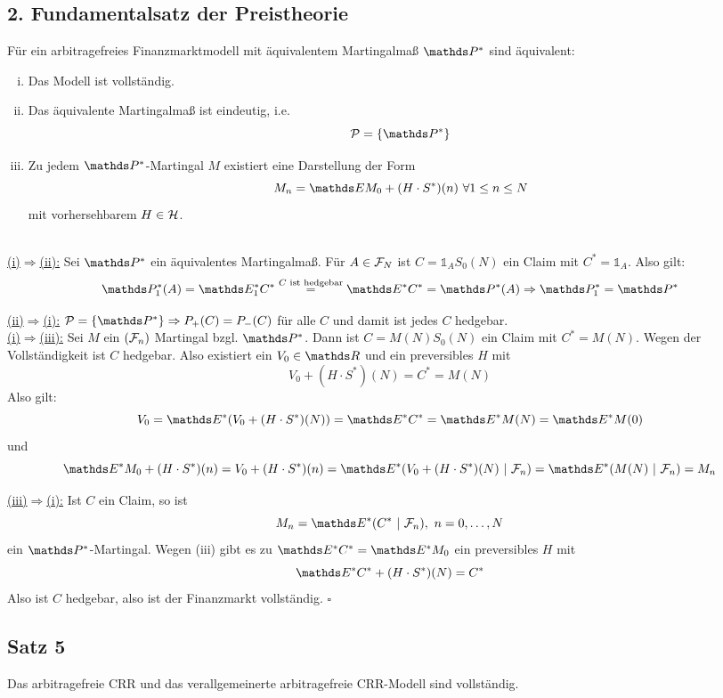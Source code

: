 \subsection{2. Fundamentalsatz der Preistheorie}
\label{sub:2_fundamentalsatz_preistheorie}
Für ein arbitragefreies Finanzmarktmodell mit äquivalentem Martingalmaß $\Pw^*$ sind äquivalent:
\begin{enumerate}[(i)]
	\item Das Modell ist vollständig.
	\item Das äquivalente Martingalmaß ist eindeutig, i.e.
	\[
	\mc{P}=\penbrace{\Pw^*}
	\]
	\item Zu jedem $\Pw^*$-Martingal $M$ existiert eine Darstellung der Form
	\[
	M_n=\E M_0 + (H\cdot S^*)(n) ~\forall 1\le n\le N
	\]
	mit vorhersehbarem $H\in\mathcal{H}$.
\end{enumerate}

\\
\uline{(i)$\Rightarrow$(ii):}
Sei $\Pw^*$ ein äquivalentes Martingalmaß.
Für $A\in \mathcal{F}_N$ ist $C=\mathbb{1}_A S_0(N)$ ein Claim mit $C^*=\mathbb{1}_A$.
Also gilt:
\[
\Pw_1^*(A)=\E_1^*C^*\stackrel{C\text{ ist hedgebar}}{=} \E^*C^*=\Pw^*(A) \Rightarrow \Pw_1^*=\Pw^*
\]

\uline{(ii)$\Rightarrow$(i):}
$\mc{P}=\penbrace{\Pw^*}\Rightarrow P_+(C)=P_-(C)$ für alle $C$ und damit ist jedes $C$ hedgebar.\\

\uline{(i)$\Rightarrow$(iii):}
Sei $M$ ein $(\mathcal{F}_n)$ Martingal bzgl. $\Pw^*$.
Dann ist $C=M(N)S_0(N)$ ein Claim mit $C^*=M(N)$.
Wegen der Vollständigkeit ist $C$ hedgebar.
Also existiert ein $V_0\in \R$ und ein preversibles $H$ mit 
\[
V_0+(H\cdot S^*)(N)=C^*=M(N)
\]
Also gilt:
\[
V_0=\E^*(V_0+(H\cdot S^*)(N))=\E^*C^*=\E^* M(N)=\E^* M(0)
\]
und
\[
\E^* M_0+ (H\cdot S^*)(n)=V_0+(H\cdot S^*)(n)= \E^*(V_0+(H\cdot S^*)(N)~|~\F_n)=\E^*(M(N)~|~\F_n)=M_n
\]

\uline{(iii)$\Rightarrow$(i):}
Ist $C$ ein Claim, so ist
\[
M_n=\E^*(C^*~|~\F_n),~n=0\dt{,}N
\]
ein $\Pw^*$-Martingal.
Wegen (iii) gibt es zu $\E^*C^*=\E^*M_0$ ein preversibles $H$ mit
\[
\E^*C^*+(H\cdot S^*)(N)=C^*
\]
Also ist $C$ hedgebar, also ist der Finanzmarkt vollständig.
\hfill $\square$

\subsection{Satz 5}
\label{sub:satz_5fima}
Das arbitragefreie CRR und das verallgemeinerte arbitragefreie CRR-Modell sind vollständig.\\

